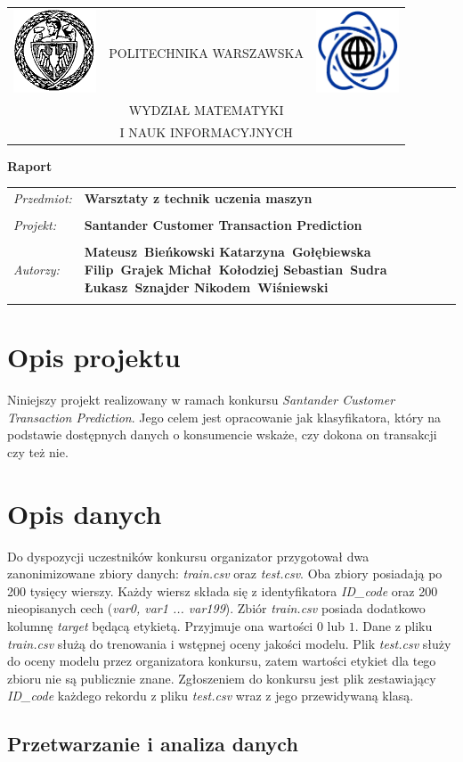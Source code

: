\documentclass[12pt]{article}
\renewcommand{\maketitle}{
\begin{titlepage}
\begin{table}[t]
\centering
\begin{tabular}[t]{lcr}
 \includegraphics[width=70pt,height=70pt]{PW} & POLITECHNIKA WARSZAWSKA & \includegraphics[width=70pt,height=70pt]{MiNI}\\
& WYDZIAŁ MATEMATYKI & \\
& I NAUK INFORMACYJNYCH &
\end{tabular}
\end{table}
\vspace*{3cm}
  \begin{center}
    \LARGE
    \textbf {Raport}\\
   \vspace*{2 cm}
\begin{table}[!htp]
\begin{tabular}{p{4cm}p{10cm}}
\textit{Przedmiot:} &\textbf {Warsztaty z technik uczenia maszyn} \\
\\
\textit{Projekt:} &\textbf {Santander Customer Transaction Prediction} \\
\\
\textit{Autorzy:} &\textbf {Mateusz~Bieńkowski \newline
	Katarzyna~Gołębiewska \newline
	Filip~Grajek \newline
	Michał~Kołodziej \newline
	Sebastian~Sudra \newline
	Łukasz~Sznajder \newline
	Nikodem~Wiśniewski \newline 
 } \\
\\
\end{tabular}
\end{table}

\vspace{4 cm}
  \center{\small Warszawa, dnia \today}
\end{center}
\end{titlepage}
}
\begin{document}
\maketitle

\newpage

\tableofcontents

\newpage

\section{Opis projektu}

Niniejszy projekt realizowany w ramach konkursu \textit{Santander Customer Transaction Prediction}\cite{santanderkaggle}. Jego celem jest opracowanie jak klasyfikatora, który na podstawie dostępnych danych o konsumencie wskaże, czy dokona on transakcji czy też nie. 

\section{Opis danych}

Do dyspozycji uczestników konkursu organizator przygotował dwa zanonimizowane zbiory danych: \textit{train.csv} oraz \textit{test.csv}. Oba zbiory posiadają po 200 tysięcy wierszy. Każdy wiersz składa się z identyfikatora \textit{ID\_code} oraz 200 nieopisanych cech (\textit{var0, var1 ... var199}). Zbiór \textit{train.csv} posiada dodatkowo kolumnę \textit{target} będącą etykietą. Przyjmuje ona wartości $0$ lub $1$. Dane z pliku \textit{train.csv} służą do trenowania i wstępnej oceny jakości modelu. Plik \textit{test.csv} służy do oceny modelu przez organizatora konkursu, zatem wartości etykiet dla tego zbioru nie są publicznie znane. Zgłoszeniem do konkursu jest plik zestawiający \textit{ID\_code} każdego rekordu z pliku \textit{test.csv} wraz z jego przewidywaną klasą.


\subsection{Przetwarzanie i analiza danych}
\end{document}

